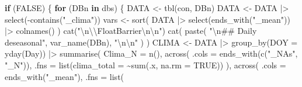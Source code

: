 \documentclass[
  10pt,
  a4paper,oneside]{article}
\newenvironment{Shaded}{\begin{snugshade}}{\end{snugshade}}
\newcommand{\AttributeTok}[1]{\textcolor[rgb]{0.77,0.63,0.00}{#1}}
\newcommand{\ConstantTok}[1]{\textcolor[rgb]{0.00,0.00,0.00}{#1}}
\newcommand{\ControlFlowTok}[1]{\textcolor[rgb]{0.13,0.29,0.53}{\textbf{#1}}}
\newcommand{\FunctionTok}[1]{\textcolor[rgb]{0.00,0.00,0.00}{#1}}
\newcommand{\NormalTok}[1]{#1}
\newcommand{\OtherTok}[1]{\textcolor[rgb]{0.56,0.35,0.01}{#1}}
\newcommand{\SpecialCharTok}[1]{\textcolor[rgb]{0.00,0.00,0.00}{#1}}
\newcommand{\StringTok}[1]{\textcolor[rgb]{0.31,0.60,0.02}{#1}}
\begin{document}
\begin{Shaded}
\begin{Highlighting}[]
\ControlFlowTok{if}\NormalTok{ (}\ConstantTok{FALSE}\NormalTok{) \{}
    \ControlFlowTok{for}\NormalTok{ (DBn }\ControlFlowTok{in}\NormalTok{ dbs) \{}
\NormalTok{        DATA }\OtherTok{\textless{}{-}} \FunctionTok{tbl}\NormalTok{(con, DBn)}
\NormalTok{        DATA }\OtherTok{\textless{}{-}}\NormalTok{ DATA }\SpecialCharTok{|\textgreater{}}
            \FunctionTok{select}\NormalTok{(}\SpecialCharTok{{-}}\FunctionTok{contains}\NormalTok{(}\StringTok{"\_clima"}\NormalTok{))}
\NormalTok{        vars }\OtherTok{\textless{}{-}} \FunctionTok{sort}\NormalTok{(}
\NormalTok{            DATA }\SpecialCharTok{|\textgreater{}}
                \FunctionTok{select}\NormalTok{(}\FunctionTok{ends\_with}\NormalTok{(}\StringTok{"\_mean"}\NormalTok{)) }\SpecialCharTok{|\textgreater{}}
                \FunctionTok{colnames}\NormalTok{()}
\NormalTok{        )}
        \FunctionTok{cat}\NormalTok{(}\StringTok{"}\SpecialCharTok{\textbackslash{}n\textbackslash{}\textbackslash{}}\StringTok{FloatBarrier}\SpecialCharTok{\textbackslash{}n\textbackslash{}n}\StringTok{"}\NormalTok{)}
        \FunctionTok{cat}\NormalTok{(}
            \FunctionTok{paste}\NormalTok{(}
                \StringTok{"}\SpecialCharTok{\textbackslash{}n}\StringTok{\#\# Daily deseasonal"}\NormalTok{, }\FunctionTok{var\_name}\NormalTok{(DBn),}
                \StringTok{"}\SpecialCharTok{\textbackslash{}n\textbackslash{}n}\StringTok{"}
\NormalTok{            )}
\NormalTok{        )}
\NormalTok{        CLIMA }\OtherTok{\textless{}{-}}\NormalTok{ DATA }\SpecialCharTok{|\textgreater{}}
            \FunctionTok{group\_by}\NormalTok{(}\AttributeTok{DOY =} \FunctionTok{yday}\NormalTok{(Day)) }\SpecialCharTok{|\textgreater{}}
            \FunctionTok{summarise}\NormalTok{(}
                \AttributeTok{Clima\_N =} \FunctionTok{n}\NormalTok{(), }\FunctionTok{across}\NormalTok{(}
                  \AttributeTok{.cols =} \FunctionTok{ends\_with}\NormalTok{(}\FunctionTok{c}\NormalTok{(}\StringTok{"\_NAs"}\NormalTok{, }\StringTok{"\_N"}\NormalTok{)),}
                  \AttributeTok{.fns =} \FunctionTok{list}\NormalTok{(}\AttributeTok{clima\_total =} \SpecialCharTok{\textasciitilde{}}\FunctionTok{sum}\NormalTok{(.x, }\AttributeTok{na.rm =} \ConstantTok{TRUE}\NormalTok{))}
\NormalTok{              ),}
                \FunctionTok{across}\NormalTok{(}
                  \AttributeTok{.cols =} \FunctionTok{ends\_with}\NormalTok{(}\StringTok{"\_mean"}\NormalTok{),}
                  \AttributeTok{.fns =} \FunctionTok{list}\NormalTok{(}

\end{Highlighting}
\end{Shaded}
\end{document}
